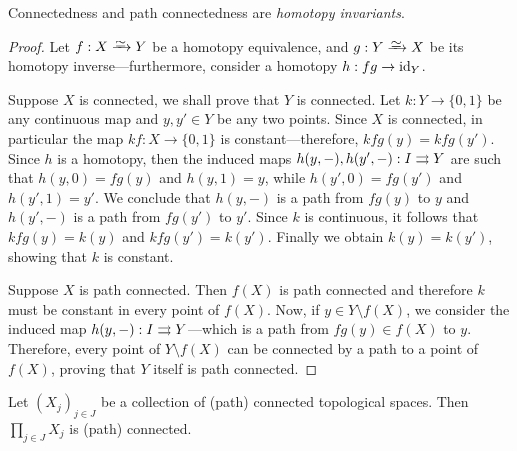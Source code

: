 \begin{proposition}
    \label{prop:path-conn-htpy-invariant}
    Connectedness and path connectedness are \emph{homotopy invariants}.
\end{proposition}

\begin{proof}
    Let \(f: X \isoto Y\) be a homotopy equivalence, and \(g: Y \isoto X\) be its
    homotopy inverse---furthermore, consider a homotopy \(h: fg \to \operatorname{id}_Y\).

    Suppose \(X\) is connected, we shall prove that \(Y\) is connected. Let
    \(k: Y \to \{0, 1\}\) be any continuous map and \(y, y' \in Y\) be any two
    points. Since \(X\) is connected, in particular the map \(k f: X \to \{0, 1\}\)
    is constant---therefore, \(k f g(y) = k f g(y')\). Since \(h\) is a homotopy,
    then the induced maps \(h(y, -), h(y', -): I \rightrightarrows Y\) are such that
    \(h(y, 0) = f g(y)\) and \(h(y, 1) = y\), while \(h(y', 0) = f g(y')\) and
    \(h(y', 1) = y'\). We conclude that \(h(y, -)\) is a path from \(fg(y)\) to
    \(y\) and \(h(y', -)\) is a path from \(fg(y')\) to \(y'\). Since \(k\) is
    continuous, it follows that \(k f g(y) = k(y)\) and \(kfg(y') = k(y')\). Finally
    we obtain \(k(y) = k(y')\), showing that \(k\) is constant.

    Suppose \(X\) is path connected. Then \(f(X)\) is path connected and therefore
    \(k\) must be constant in every point of \(f(X)\). Now, if
    \(y \in Y \setminus f(X)\), we consider the induced map
    \(h(y, -): I \rightrightarrows Y\)---which is a path from \(fg(y) \in f(X)\) to
    \(y\). Therefore, every point of \(Y \setminus f(X)\) can be connected by a path
    to a point of \(f(X)\), proving that \(Y\) itself is path connected.
\end{proof}

\begin{proposition}
    \label{prop:products-preserve-connectedness}
    Let \((X_{j})_{j \in J}\) be a collection of (path) connected topological
    spaces. Then \(\prod_{j \in J} X_j\) is (path) connected.
\end{proposition}

